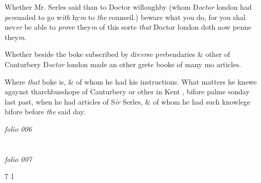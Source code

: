 \documentclass[12pt, a4paper]{book}
\begin{document}
            		
            			
		\ifthenelse{\isodd{\thepage}}
		{\reversemarginpar}
		{\normalmarginpar}
		Whether Mr. Serles said than to Doctor willoughby
 (whom D\textit{octor} london had \textit{per}suaded to go w\textit{ith} hy\textit{m} to \textit{the}
 counseil.) beware what you do, for you shal nev\textit{er}
 be able to \textit{pro}ve they\textit{m} of this sorte \textit{that} Doctor london doth
            			now penne they\textit{m}.
            		
			
				
		\ifthenelse{\isodd{\thepage}}
		{\reversemarginpar}
		{\normalmarginpar}
		Whether beside the boke subscribed by div\textit{er}se p\textit{re}bendaries
					\& other of Canturbery D\textit{octor} london made an other
	grete booke of many mo articles.
			
            		
            			
		\ifthenelse{\isodd{\thepage}}
		{\reversemarginpar}
		{\normalmarginpar}
		Where \textit{that} boke is, \& of whom he had his instructions. What matters he knewe agaynst tharchbusshope of Canturbery or other in Kent
			, bifore palme sonday last past, when he had articles of S\textit{ir} Serles, \& of whom he had such knowlege bifore before \textit{the} said day.
            		

\dotfill
					

\textit{folio 006}
		
         		\vspace{4cm}
         
      	
\dotfill
					  \section*{}  \subsection*{}

\textit{folio 007}



				\begin{flushright}{\color{Mahogany}7} 1\end{flushright}
            			
\end{document}
